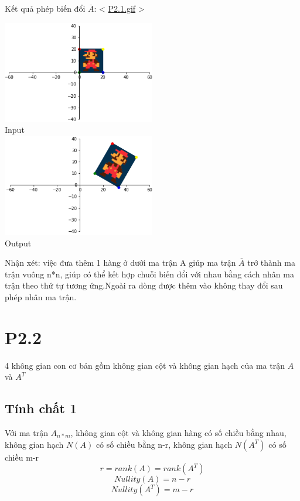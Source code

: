 \documentclass[a4paper,11pt]{article}
\theoremstyle{mytheor}
\begin{document}
\\
\\
Kết quả phép biến đổi $\overline{A}$: < \href{https://drive.google.com/open?id=1cn1MvcO2GaH6VP82nk3vjckOZAmmLQwO}{P2.1.gif} >

\begin{multicols}{2}
\centering
\includegraphics[width=0.5\textwidth]{P2_1_01.png}
\\Input
\columnbreak
\\
\centering
\includegraphics[width=0.5\textwidth]{P2_1_02.png}
\\Output
\end{multicols}

Nhận xét: việc đưa thêm 1 hàng ở dưới ma trận A giúp ma trận $\overline{A}$ trở thành ma trận vuông n*n, giúp có thể kết hợp chuỗi biến đổi với nhau bằng cách nhân ma trận theo thứ tự tương ứng.Ngoài ra dòng được thêm vào không thay đổi sau phép nhân ma trận. 


\section*{P2.2}
4 không gian con cơ bản gồm không gian cột và không gian hạch của ma trận $A$ và $A^T$

\subsection*{Tính chất 1}
Với ma trận $A_{n*m}$, không gian cột và không gian hàng có số chiều bằng nhau, không gian hạch $N(A)$ có số chiều bằng n-r, không gian hạch $N(A^T)$ có số chiều m-r
$$r = rank(A) = rank(A^T)$$
$$Nullity(A) = n-r $$
$$Nullity(A^T) = m-r$$
\end{document}
